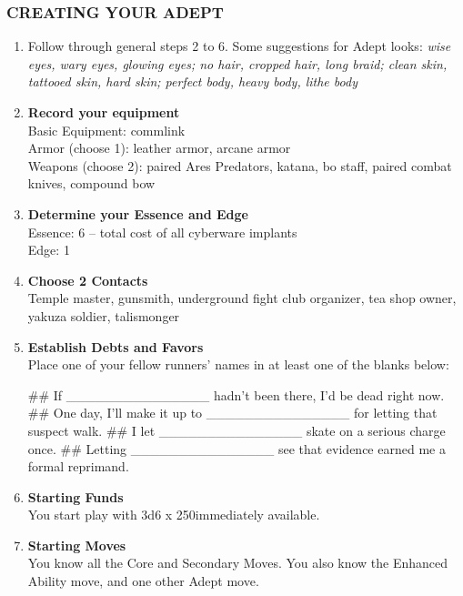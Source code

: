 \subsubsection{CREATING YOUR ADEPT}
\begin{enumerate}
    \item Follow through general steps 2 to 6. Some suggestions for Adept looks: \textit{wise eyes, wary eyes, glowing eyes; no hair, cropped hair, long braid; clean skin, tattooed skin, hard skin; perfect body, heavy body, lithe body}
    
    \item \textbf{Record your equipment} \\
    Basic Equipment: commlink \\
    Armor (choose 1): leather armor, arcane armor \\
    Weapons (choose 2): paired Ares Predators, katana, bo staff, paired combat knives, compound bow
    
    \item \textbf{Determine your Essence and Edge} \\
    Essence: 6 – total cost of all cyberware implants \\
    Edge: 1
    
    \item \textbf{Choose 2 Contacts} \\
    Temple master, gunsmith, underground fight club organizer, tea shop owner, yakuza soldier, talismonger
    
    \item \textbf{Establish Debts and Favors} \\
    Place one of your fellow runners’ names in at least one of the blanks below:
        \begin{easylist}
            ## If \_\_\_\_\_\_\_\_\_\_\_\_\_\_\_ hadn’t been there, I’d be dead right now.
            ## One day, I’ll make it up to \_\_\_\_\_\_\_\_\_\_\_\_\_\_\_ for letting that suspect walk.
            ## I let \_\_\_\_\_\_\_\_\_\_\_\_\_\_\_ skate on a serious charge once. 
            ## Letting \_\_\_\_\_\_\_\_\_\_\_\_\_\_\_ see that evidence earned me a formal reprimand.
        \end{easylist}
    
    \item \textbf{Starting Funds} \\
    You start play with 3d6 x 250\nuyen immediately available.
    
    \item \textbf{Starting Moves} \\
    You know all the Core and Secondary Moves. You also know the Enhanced Ability move, and one other Adept move.
\end{enumerate}


